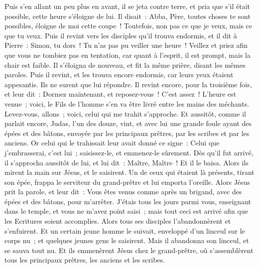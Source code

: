 \begin{multicols}{2}
Puis s'en allant un peu plus en avant, il se jeta contre terre, et pria que s'il était possible, cette heure s'éloigne de lui.
Il disait~: Abba, Père, toutes choses te sont possibles, éloigne de moi cette coupe~! Toutefois, non pas ce que je veux, mais ce que tu veux.
Puis il revint vers les disciples qu'il trouva endormis, et il dit à Pierre~: Simon, tu dors~! Tu n'as pas pu veiller une heure~!
Veillez et priez afin que vous ne tombiez pas en tentation, car quant à l'esprit, il est prompt, mais la chair est faible.
Il s'éloigna de nouveau, et fit la même prière, disant les mêmes paroles.
Puis il revint, et les trouva encore endormis, car leurs yeux étaient appesantis. Ils ne surent que lui répondre.
Il revint encore, pour la troisième fois, et leur dit~: Dormez maintenant, et reposez-vous~! C'est assez~! L'heure est venue~; voici, le Fils de l'homme s'en va être livré entre les mains des méchants.
Levez-vous, allons~; voici, celui qui me trahit s'approche.
Et aussitôt, comme il parlait encore, Judas, l'un des douze, vint, et avec lui une grande foule ayant des épées et des bâtons, envoyée par les principaux prêtres, par les scribes et par les anciens.
Or celui qui le trahissait leur avait donné ce signe~: Celui que j'embrasserai, c'est lui~; saisissez-le, et emmenez-le sûrement.
Dès qu'il fut arrivé, il s'approcha aussitôt de lui, et lui dit~: Maître, Maître~! Et il le baisa.
Alors ils mirent la main sur Jésus, et le saisirent.
Un de ceux qui étaient là présents, tirant son épée, frappa le serviteur du grand-prêtre et lui emporta l'oreille.
Alors Jésus prit la parole, et leur dit~: Vous êtes venus comme après un brigand, avec des épées et des bâtons, pour m'arrêter.
J'étais tous les jours parmi vous, enseignant dans le temple, et vous ne m'avez point saisi~; mais tout ceci est arrivé afin que les Ecritures soient accomplies.
Alors tous ses disciples l'abandonnèrent et s'enfuirent.
Et un certain jeune homme le suivait, enveloppé d'un linceul sur le corps nu~; et quelques jeunes gens le saisirent.
Mais il abandonna son linceul, et se sauva tout nu.
Et ils emmenèrent Jésus chez le grand-prêtre, où s'assemblèrent tous les principaux prêtres, les anciens et les scribes.

\end{multicols}
